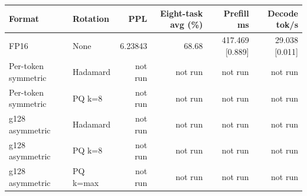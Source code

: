 \begin{tabular}{llrrrr}
\toprule
Format & Rotation & PPL & Eight-task avg (\%) & Prefill ms & Decode tok/s \\
\midrule
FP16 & None & 6.23843 & 68.68 & 417.469 [0.889] & 29.038 [0.011] \\
Per-token symmetric & Hadamard & not run & not run & not run & not run \\
Per-token symmetric & PQ k=8 & not run & not run & not run & not run \\
g128 asymmetric & Hadamard & not run & not run & not run & not run \\
g128 asymmetric & PQ k=8 & not run & not run & not run & not run \\
g128 asymmetric & PQ k=max & not run & not run & not run & not run \\
\bottomrule
\end{tabular}

